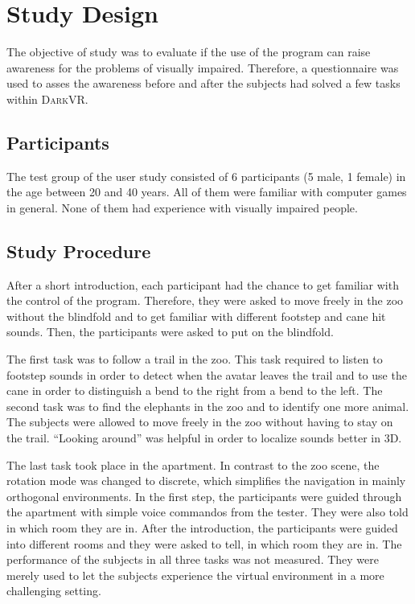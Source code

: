 \documentclass{sig-alternate}
\newcommand{\darkvr}{\textsc{DarkVR}\xspace}
\begin{document}
\section{Study Design}
\label{sec:study}
The objective of study was to evaluate if the use of the program can raise
awareness for the problems of visually impaired. Therefore, a questionnaire was
used to asses the awareness before and after the subjects had solved a few
tasks within \darkvr. 

\subsection{Participants}

The test group of the user study consisted of 6 participants (5 male, 1 female)
in the age between 20 and 40 years. All of them were familiar with computer
games in general. None of them had experience with visually impaired people.

\subsection{Study Procedure}

After a short introduction, each participant had the chance to get familiar with
the control of the program. Therefore, they were asked to move freely in the zoo
without the blindfold and to get familiar with different footstep and cane hit
sounds. Then, the participants were asked to put on the blindfold.

The first task was to follow a trail in the zoo. This task required to listen to
footstep sounds in order to detect when the avatar leaves the trail and to use
the cane in order to distinguish a bend to the right from a bend to the left.
The second task was to find the elephants in the zoo and to identify one more
animal. The subjects were allowed to move freely in the zoo without having to
stay on the trail. ``Looking around'' was helpful in order to localize sounds
better in 3D.

The last task took place in the apartment. In contrast to the zoo scene, the
rotation mode was changed to discrete, which simplifies the navigation in mainly
orthogonal environments. In the first step, the participants were guided through
the apartment with simple voice commandos from the tester. They were also told
in which room they are in. After the introduction, the participants were guided
into different rooms and they were asked to tell, in which room they are in. The
performance of the subjects in all three tasks was not measured. They were
merely used to let the subjects experience the virtual environment in a more
challenging setting.
\end{document}
